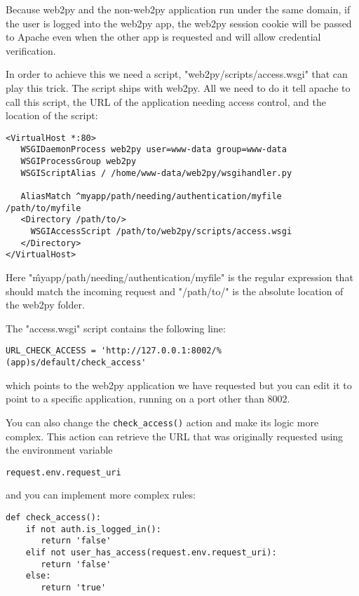 \documentclass[justified,sixbynine,notoc]{tufte-book}
\def\ft{\small\tt}
\begin{document}
\begin{fullwidth}
Because web2py and the non-web2py application run under the same domain, if the user is logged into the web2py app, the web2py session cookie will be passed to Apache even when the other app is requested and will allow credential verification.

In order to achieve this we need a script, "web2py/scripts/access.wsgi" that can play this trick.
The script ships with web2py. All we need to do it tell apache to call this script, the URL of the application needing access control, and the location of the script:

\begin{lstlisting}[keywords={}]
<VirtualHost *:80>
   WSGIDaemonProcess web2py user=www-data group=www-data
   WSGIProcessGroup web2py
   WSGIScriptAlias / /home/www-data/web2py/wsgihandler.py

   AliasMatch ^myapp/path/needing/authentication/myfile /path/to/myfile
   <Directory /path/to/>
     WSGIAccessScript /path/to/web2py/scripts/access.wsgi
   </Directory>
</VirtualHost>
\end{lstlisting}

Here "\^myapp/path/needing/authentication/myfile" is the regular expression that should match the incoming request and "/path/to/" is the absolute location of the web2py folder.

The "access.wsgi" script contains the following line:

\begin{lstlisting}
URL_CHECK_ACCESS = 'http://127.0.0.1:8002/%(app)s/default/check_access'
\end{lstlisting}
\noindent which points to the web2py application we have requested but you can edit it to point to a specific application, running on a port other than 8002.

You can also change the {\ft check\_access()} action and make its logic more complex. This action can retrieve the URL that was originally requested using the environment variable

\begin{lstlisting}
request.env.request_uri
\end{lstlisting}
\noindent and you can implement more complex rules:

\begin{lstlisting}
def check_access():
    if not auth.is_logged_in():
       return 'false'
    elif not user_has_access(request.env.request_uri):
       return 'false'
    else:
       return 'true'
\end{lstlisting}


\end{fullwidth}
\end{document}
